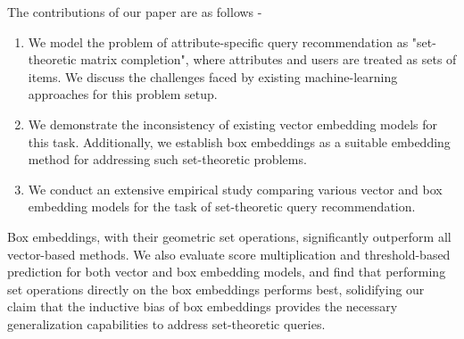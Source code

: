 The contributions of our paper are as follows -
\begin{enumerate}
    \item We model the problem of attribute-specific query recommendation as "set-theoretic matrix completion", where attributes and users are treated as sets of items. We discuss the challenges faced by existing machine-learning approaches for this problem setup.
    \item We demonstrate the inconsistency of existing vector embedding models for this task. Additionally, we establish box embeddings as a suitable embedding method for addressing such set-theoretic problems.
    \item We conduct an extensive empirical study comparing various vector and box embedding models for the task of set-theoretic query recommendation.
\end{enumerate}

Box embeddings, with their geometric set operations, significantly outperform all vector-based methods. We also evaluate score multiplication and threshold-based prediction for both vector and box embedding models, and find that performing set operations directly on the box embeddings performs best, solidifying our claim that the inductive bias of box embeddings provides the necessary generalization capabilities to address set-theoretic queries.